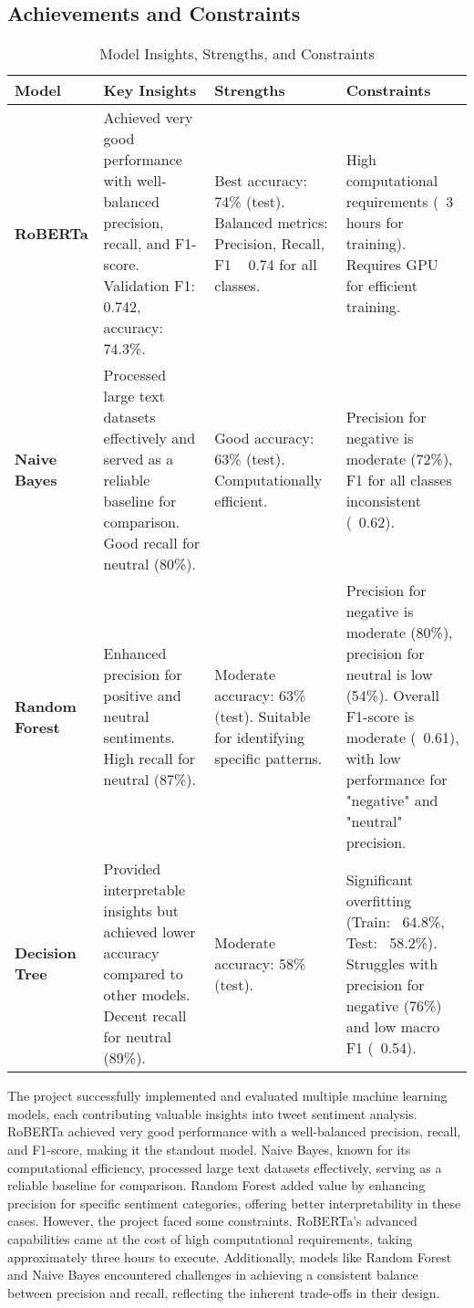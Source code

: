 \documentclass[journal]{IEEEtran}
\begin{document}
\subsection{\textbf{Achievements and Constraints}}
\begin{table}[H]
\centering

\begin{tabular}{|p{1cm}|p{2cm}|p{2cm}|p{2cm}|}
\hline
\textbf{Model} & \textbf{Key Insights} & \textbf{Strengths} & \textbf{Constraints} \\ \hline
\textbf{RoBERTa} & Achieved very good performance with well-balanced precision, recall, and F1-score. Validation F1: 0.742, accuracy: 74.3\%. & Best accuracy: 74\% (test). Balanced metrics: Precision, Recall, F1 ~ 0.74 for all classes. & High computational requirements (~3 hours for training). Requires GPU for efficient training. \\ \hline
\textbf{Naive Bayes} & Processed large text datasets effectively and served as a reliable baseline for comparison. Good recall for neutral (80\%). & Good accuracy: 63\% (test). Computationally efficient. & Precision for negative is moderate (72\%), F1 for all classes inconsistent (~0.62). \\ \hline
\textbf{Random Forest} & Enhanced precision for positive and neutral sentiments. High recall for neutral (87\%). & Moderate accuracy: 63\% (test). Suitable for identifying specific patterns. & Precision for negative is moderate (80\%), precision for neutral is low (54\%). Overall F1-score is moderate (~0.61), with low performance for "negative" and "neutral" precision. \\ \hline
\textbf{Decision Tree} & Provided interpretable insights but achieved lower accuracy compared to other models. Decent recall for neutral (89\%). & Moderate accuracy: 58\% (test). & Significant overfitting (Train: ~64.8\%, Test: ~58.2\%). Struggles with precision for negative (76\%) and low macro F1 (~0.54). \\ \hline
\end{tabular}
\caption{Model Insights, Strengths, and Constraints}
\end{table}

The project successfully implemented and evaluated multiple machine learning models, each contributing valuable insights into tweet sentiment analysis. RoBERTa achieved very good performance with a well-balanced precision, recall, and F1-score, making it the standout model. Naive Bayes, known for its computational efficiency, processed large text datasets effectively, serving as a reliable baseline for comparison. Random Forest added value by enhancing precision for specific sentiment categories, offering better interpretability in these cases. However, the project faced some constraints. RoBERTa's advanced capabilities came at the cost of high computational requirements, taking approximately three hours to execute. Additionally, models like Random Forest and Naive Bayes encountered challenges in achieving a consistent balance between precision and recall, reflecting the inherent trade-offs in their design.
\end{document}
